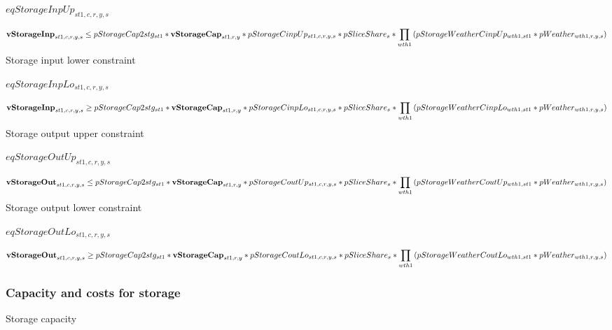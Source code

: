 \documentclass{article}
\begin{document}
$eqStorageInpUp_{st1,c,r,y,s}$





\begin{dmath} 
{\bf vStorageInp}_{st1,c,r,y,s}  \le  pStorageCap2stg_{st1}*{\bf vStorageCap}_{st1,r,y}*pStorageCinpUp_{st1,c,r,y,s}*pSliceShare_{s}*\prod_{wth1}{\left(pStorageWeatherCinpUp_{wth1,st1}*pWeather_{wth1,r,y,s}\right)}
\end{dmath} 
Storage input lower constraint







$eqStorageInpLo_{st1,c,r,y,s}$





\begin{dmath} 
{\bf vStorageInp}_{st1,c,r,y,s}  \ge  pStorageCap2stg_{st1}*{\bf vStorageCap}_{st1,r,y}*pStorageCinpLo_{st1,c,r,y,s}*pSliceShare_{s}*\prod_{wth1}{\left(pStorageWeatherCinpLo_{wth1,st1}*pWeather_{wth1,r,y,s}\right)}
\end{dmath} 
Storage output upper constraint







$eqStorageOutUp_{st1,c,r,y,s}$





\begin{dmath} 
{\bf vStorageOut}_{st1,c,r,y,s}  \le  pStorageCap2stg_{st1}*{\bf vStorageCap}_{st1,r,y}*pStorageCoutUp_{st1,c,r,y,s}*pSliceShare_{s}*\prod_{wth1}{\left(pStorageWeatherCoutUp_{wth1,st1}*pWeather_{wth1,r,y,s}\right)}
\end{dmath} 
Storage output lower constraint







$eqStorageOutLo_{st1,c,r,y,s}$





\begin{dmath} 
{\bf vStorageOut}_{st1,c,r,y,s}  \ge  pStorageCap2stg_{st1}*{\bf vStorageCap}_{st1,r,y}*pStorageCoutLo_{st1,c,r,y,s}*pSliceShare_{s}*\prod_{wth1}{\left(pStorageWeatherCoutLo_{wth1,st1}*pWeather_{wth1,r,y,s}\right)}
\end{dmath} 
\subsubsection*{Capacity and costs for storage}
Storage capacity
\end{document}
